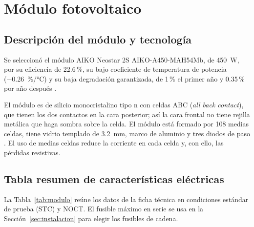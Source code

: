 \section{Módulo fotovoltaico}\label{sec:modulo}

\subsection{Descripción del módulo y tecnología}

Se seleccionó el módulo AIKO Neostar 2S AIKO-A450-MAH54Mb, de \SI{450}{W}, por su eficiencia de 22.6\,\%, su bajo coeficiente de temperatura de potencia (\SI{-0.26}{\%/\celsius}) y su baja degradación garantizada, de 1\,\% el primer año y 0.35\,\% por año después \cite{aiko_ds}.

El módulo es de silicio monocristalino tipo n con celdas ABC (\emph{all back contact}), que tienen los dos contactos en la cara posterior; así la cara frontal no tiene rejilla metálica que haga sombra sobre la celda. El módulo está formado por 108 medias celdas, tiene vidrio templado de \SI{3.2}{mm}, marco de aluminio y tres diodos de paso \cite{aiko_ds}. El uso de medias celdas reduce la corriente en cada celda y, con ello, las pérdidas resistivas.

\subsection{Tabla resumen de características eléctricas}

La Tabla~\ref{tab:modulo} reúne los datos de la ficha técnica en condiciones estándar de prueba (STC) y NOCT. El fusible máximo en serie se usa en la Sección~\ref{sec:instalacion} para elegir los fusibles de cadena.

